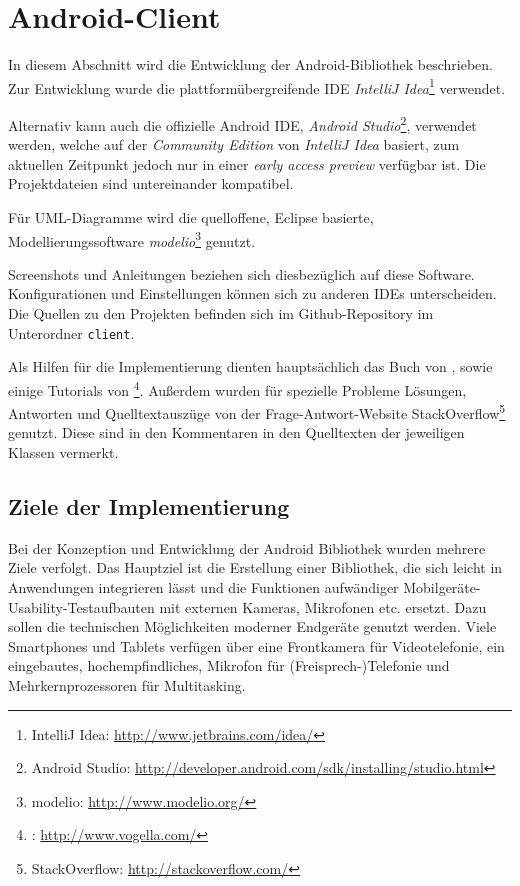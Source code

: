 \section{Android-Client\label{sec:android_client}}

In diesem Abschnitt wird die Entwicklung der Android-Bibliothek beschrieben. 
Zur Entwicklung wurde die plattformübergreifende IDE \emph{IntelliJ Idea}\footnote{IntelliJ Idea: \url{http://www.jetbrains.com/idea/}} verwendet.

Alternativ kann auch die offizielle Android \ac{IDE}, \emph{Android Studio}\footnote{Android Studio: \url{http://developer.android.com/sdk/installing/studio.html}}, verwendet werden, welche auf der \emph{Community Edition} von \emph{IntelliJ Idea} basiert, zum aktuellen Zeitpunkt jedoch nur in einer \emph{early access preview} verfügbar ist.
Die Projektdateien sind untereinander kompatibel.

Für UML-Diagramme wird die quelloffene, Eclipse basierte, Modellierungssoftware \emph{modelio}\footnote{modelio: \url{http://www.modelio.org/}} genutzt.

Screenshots und Anleitungen beziehen sich diesbezüglich auf diese Software. 
Konfigurationen und Einstellungen können sich zu anderen IDEs unterscheiden.
Die Quellen zu den Projekten befinden sich im Github-Repository im Unterordner \texttt{client}.

Als Hilfen für die Implementierung dienten hauptsächlich das Buch  von \citeauthor*{android4}, sowie einige Tutorials von \citeauthor*{androidvogella}\footnote{\citeauthor*{androidvogella}: \url{http://www.vogella.com/}}.
Außerdem wurden für spezielle Probleme Lösungen, Antworten und Quelltextauszüge von der Frage-Antwort-Website StackOverflow\footnote{StackOverflow: \url{http://stackoverflow.com/}} genutzt.
Diese sind in den Kommentaren in den Quelltexten der jeweiligen Klassen vermerkt.


\subsection{Ziele der Implementierung}
Bei der Konzeption und Entwicklung der Android Bibliothek wurden mehrere Ziele verfolgt.
Das Hauptziel ist die Erstellung einer Bibliothek, die sich leicht in Anwendungen integrieren lässt und die Funktionen aufwändiger Mobilgeräte-Usability-Testaufbauten mit externen Kameras, Mikrofonen etc. ersetzt.
Dazu sollen die technischen Möglichkeiten moderner Endgeräte genutzt werden.
Viele Smartphones und Tablets verfügen über eine Frontkamera für Videotelefonie, ein eingebautes, hochempfindliches, Mikrofon für (Freisprech-)Telefonie und Mehrkernprozessoren für Multitasking.

